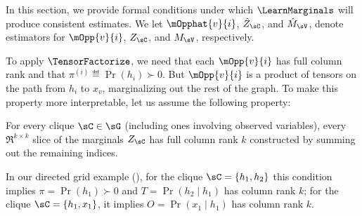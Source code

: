 In this section, we provide formal conditions under which $\LearnMarginals$
will produce consistent estimates.
We let
$\mOpphat{v}{i}$,
$\hat Z_\sC$,
and $\hat M_\sV$,
denote estimators for
$\mOpp{v}{i}$,
$Z_\sC$,
and $M_\sV$,
respectively.

To apply $\TensorFactorize$, we need that each $\mOpp{v}{i}$ has full
  column rank and that $\pi^{(i)} \eqdef \Pr(h_i) \succ 0$.
But $\mOpp{v}{i}$ is a product of
tensors on the path from $h_i$ to $x_v$, marginalizing out the rest of the graph.
To make this property more interpretable, let us assume the following property:%
\begin{assumption} 
\label{asm:full-rank-plus}
For every clique $\sC \in \sG$ (including ones involving observed variables),
  every $\Re^{k \times k}$ slice of the marginals $Z_\sC$ has full column
  rank $k$ constructed by summing out the remaining indices.
\end{assumption}
In our directed grid example (), for the clique $\sC = \{ h_1, h_2 \}$ this
  condition implies $\pi = \Pr(h_1) \succ 0$ and $T = \Pr(h_2 \mid h_1)$ has column rank $k$; 
for the clique $\sC = \{ h_1, x_1 \}$, it implies $O = \Pr(x_1 \mid h_1)$ has column rank $k$.


